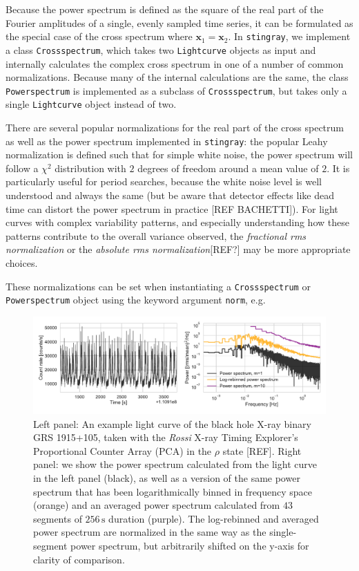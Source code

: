 \documentclass[12pt]{emulateapj}
\newcommand{\stingray}{\texttt{stingray}\xspace}
\newcommand{\lightcurve}{\texttt{Lightcurve}\xspace}
\newcommand{\crossspectrum}{\texttt{Crossspectrum}\xspace}
\newcommand{\powerspectrum}{\texttt{Powerspectrum}\xspace}
\begin{document}
Because the power spectrum is defined as the square of the real part of the Fourier amplitudes of a single, evenly sampled time series, it can be formulated as the special case of the cross spectrum where $\mathbf{x}_1 = \mathbf{x}_2$. In \stingray, we implement a class \crossspectrum, which takes two \lightcurve objects as input and internally calculates the complex cross spectrum in one of a number of common normalizations.  Because many of the internal calculations are the same, the class \powerspectrum is implemented as a subclass of \crossspectrum, but takes only a single \lightcurve object instead of two. 

There are several popular normalizations for the real part of the cross spectrum as well as the power spectrum implemented in \stingray: the popular Leahy normalization \citep{leahy1983} is defined such that for simple white noise, the power spectrum will follow a $\chi^2$ distribution with $2$ degrees of freedom around a mean value of $2$. It is particularly useful for period searches, because the white noise level is well understood and always the same (but be aware that detector effects like dead time can distort the power spectrum in practice [REF BACHETTI]).
For light curves with complex variability patterns, and especially understanding how these patterns contribute to the overall variance observed, the \textit{fractional rms normalization}\citep{belloni1990,miyamoto1992}  or the \textit{absolute rms normalization}[REF?] may be more appropriate choices. 

These normalizations can be set when instantiating a \crossspectrum or \powerspectrum object using the keyword argument \texttt{norm}, e.g.
\begin{figure}[htbp]
\begin{center}
\includegraphics[width=\textwidth]{example_lc_ps.pdf}
\caption{Left panel: An example light curve of the black hole X-ray binary GRS 1915+105, taken with the \textit{Rossi} X-ray Timing Explorer's Proportional Counter Array (PCA) in the $\rho$ state [REF]. Right panel: we show the power spectrum calculated from the light curve in the left panel (black), as well as a version of the same power spectrum that has been logarithmically binned in frequency space (orange) and an averaged power spectrum calculated from $43$ segments of $256\,\mathrm{s}$ duration (purple). The log-rebinned and averaged power spectrum are normalized in the same way as the single-segment power spectrum, but arbitrarily shifted on the y-axis for clarity of comparison.}
\label{fig:psd}
\end{center}
\end{figure}
\end{document}
